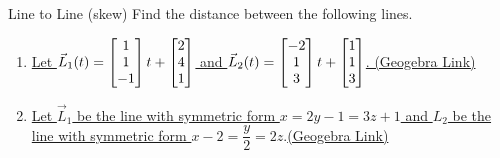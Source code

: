\begin{exercise}{Line to Line (skew)}
Find the distance between the following lines.
\vspace{1em}
\begin{enumerate}
\item \href{https://www.geogebra.org/3d/js6pygd7}{Let $\vec{L}_1(t)=\begin{bmatrix}1\\1\\-1\end{bmatrix}t+\begin{bmatrix}2\\4\\1\end{bmatrix}$ and $\vec{L}_2(t)=\begin{bmatrix}-2\\1\\3\end{bmatrix}t+\begin{bmatrix}1\\1\\3\end{bmatrix}$. (Geogebra Link)}
\vspace{1em}
\item \href{https://www.geogebra.org/3d/y349fgsf}{Let $\vec{L}_1$ be the line with symmetric form $x=2y-1=3z+1 $ and $L_2$ be the line with symmetric form  $x-2=\dfrac{y}{2}=2z.$(Geogebra Link)}
\end{enumerate}
\end{exercise}